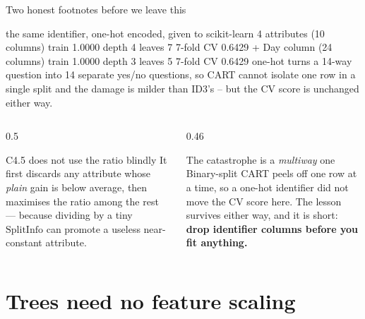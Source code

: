 \documentclass[aspectratio=169]{beamer}
\begin{document}
\begin{frame}[fragile,shrink=8]{Two honest footnotes before we leave this}
\begin{outblk}
the same identifier, one-hot encoded, given to scikit-learn
   4 attributes  (10 columns)     train 1.0000  depth 4  leaves 7  7-fold CV 0.6429
   + Day column  (24 columns)     train 1.0000  depth 3  leaves 5  7-fold CV 0.6429
   one-hot turns a 14-way question into 14 separate yes/no questions,
   so CART cannot isolate one row in a single split and the damage is
   milder than ID3's -- but the CV score is unchanged either way.
\end{outblk}
\begin{columns}[T]
  \begin{column}{0.5\textwidth}
    \begin{block}{C4.5 does not use the ratio blindly}
      \small It first discards any attribute whose \emph{plain} gain is below
      average, then maximises the ratio among the rest --- because dividing by
      a tiny $\mathrm{SplitInfo}$ can promote a useless near-constant
      attribute.
    \end{block}
  \end{column}
  \begin{column}{0.46\textwidth}
    \begin{alertblock}{The catastrophe is a \emph{multiway} one}
      \small Binary-split CART peels off one row at a time, so a one-hot
      identifier did not move the CV score here. The lesson survives either
      way, and it is short: \textbf{drop identifier columns before you fit
      anything.}
    \end{alertblock}
  \end{column}
\end{columns}
\end{frame}

\section[Scale]{Trees need no feature scaling}
\label{sec:scale}
\end{document}
